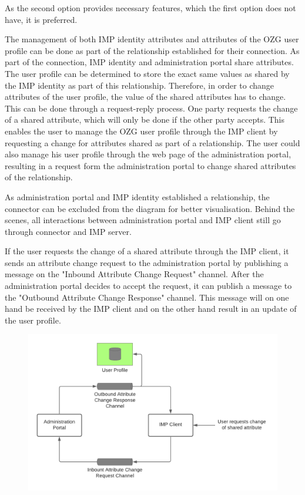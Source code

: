 \documentclass[
     12pt,         %
     a4paper,      %
     BCOR=10mm,version=first,     %
     DIV=14,version=first,        %
     ]{scrreprt}
\begin{document}
As the second option provides necessary features, which the first option does not have, it is preferred.

The management of both IMP identity attributes and attributes of the OZG user profile can be done as part of the relationship established for their connection. As part of the connection, IMP identity and administration portal share attributes. The user profile can be determined to store the exact same values as shared by the IMP identity as part of this relationship. Therefore, in order to change attributes of the user profile, the value of the shared attributes has to change. This can be done through a request-reply process. One party requests the change of a shared attribute, which will only be done if the other party accepts. This enables the user to manage the OZG user profile through the IMP client by requesting a change for attributes shared as part of a relationship. The user could also manage his user profile through the web page of the administration portal, resulting in a request form the administration portal to change shared attributes of the relationship.

As administration portal and IMP identity established a relationship, the connector can be excluded from the diagram for better visualisation. Behind the scenes, all interactions between administration portal and IMP client still go through connector and IMP server.

If the user requests the change of a shared attribute through the IMP client, it sends an attribute change request to the administration portal by publishing a message on the "Inbound Attribute Change Request" channel. After the administration portal decides to accept the request, it can publish a message to the "Outbound Attribute Change Response" channel. This message will on one hand be received by the IMP client and on the other hand result in an update of the user profile. 

\begin{figure}[h]
    \centering
    \includegraphics[scale=0.3]{Diagrams/Integration Architecture 1/Overview/Attribute Change IMP Client.png}
\end{figure}
\end{document}

